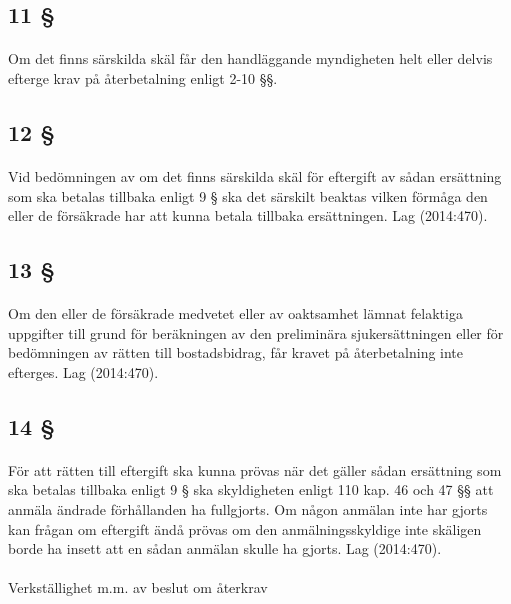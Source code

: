 \documentclass[a4paper,notitlepage,openany,10pt]{book}
\begin{document}
\subsection*{11 §}
\paragraph*{}
Om det finns särskilda skäl får den handläggande myndigheten helt eller delvis efterge krav på återbetalning enligt 2-10 §§.
\subsection*{12 §}
\paragraph*{}
Vid bedömningen av om det finns särskilda skäl för eftergift av sådan ersättning som ska betalas tillbaka enligt 9 § ska det särskilt beaktas vilken förmåga den eller de försäkrade har att kunna betala tillbaka ersättningen.
Lag (2014:470).
\subsection*{13 §}
\paragraph*{}
Om den eller de försäkrade medvetet eller av oaktsamhet lämnat felaktiga uppgifter till grund för beräkningen av den preliminära sjukersättningen eller för bedömningen av rätten till bostadsbidrag, får kravet på återbetalning inte efterges.
Lag (2014:470).
\subsection*{14 §}
\paragraph*{}
För att rätten till eftergift ska kunna prövas när det gäller sådan ersättning som ska betalas tillbaka enligt 9 § ska skyldigheten enligt 110 kap. 46 och 47 §§ att anmäla ändrade förhållanden ha fullgjorts. Om någon anmälan inte har gjorts kan frågan om eftergift ändå prövas om den anmälningsskyldige inte skäligen borde ha insett att en sådan anmälan skulle ha gjorts.
Lag (2014:470).
\paragraph*{}
Verkställighet m.m. av beslut om återkrav
\end{document}

